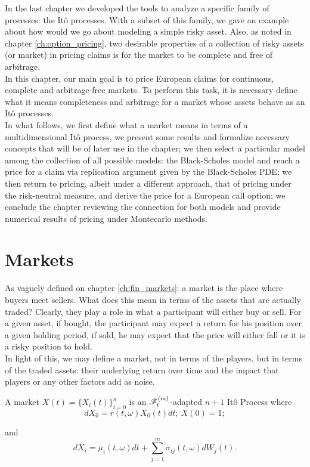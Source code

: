 \documentclass[../TGMAFFIRO.tex]{subfiles}
\begin{document}
In the last chapter we developed the tools to analyze a specific family of processes: the It\^o processes. With a subset of this family, we gave an example about how would we go about modeling a simple risky asset. Also, as noted in chapter \ref{ch:option_pricing}, two desirable properties of a collection of risky assets (or market) in pricing claims is for the market to be complete and free of arbitrage.\\

In this chapter, our main goal is to price European claims for continuous, complete and arbitrage-free markets. To perform this task, it is necessary define what it means completeness and arbitrage for a market whose assets behave as an It\^o processes.\\

In what follows, we first define what a market means in terms of a multidimensional It\^o process, we present some results and formalize necessary concepts that will be of later use in the chapter; we then select a particular model among the collection of all possible models: the Black-Scholes model and reach a price for a claim via replication argument given by the Black-Scholes PDE; we then return to pricing, albeit under a different approach, that of pricing under the risk-neutral measure, and derive the price for a European call option; we conclude the chapter reviewing the connection for both models and provide numerical results of pricing under Montecarlo methods.\\

\section{Markets}
As vaguely defined on chapter \ref{ch:fin_markets}: a market is the place where buyers meet sellers. What does this mean in terms of the assets that are actually traded? Clearly, they play a role in what a participant will either buy or sell. For a given asset, if bought, the participant may expect a return for his position over a given holding period, if sold, he may expect that the price will either fall or it is a risky position to hold.\\

In light of this, we may define a market, not in terms of the players, but in terms of the traded assets: their underlying return over time and the impact that players or any other factors add as noise. 
\begin{definition}
	A market $X(t) = \{X_i(t)\}_{i=0}^n$ is an $\mathscr{F}^{(m)}_t$-adapted $n+1$ It\^o Process where
	\begin{equation}
		dX_0 = r(t,\omega) X_0(t) dt; \ X(0) = 1; \label{eq:safe_investment}
	\end{equation}
	
	and
	\begin{equation}
		dX_i = \mu_i(t,\omega) dt + \sum_{j=1}^{m}\sigma_{ij}(t,\omega)dW_j(t) \label{eq:risky_asset}.
	\end{equation}
\end{definition}
\end{document}
